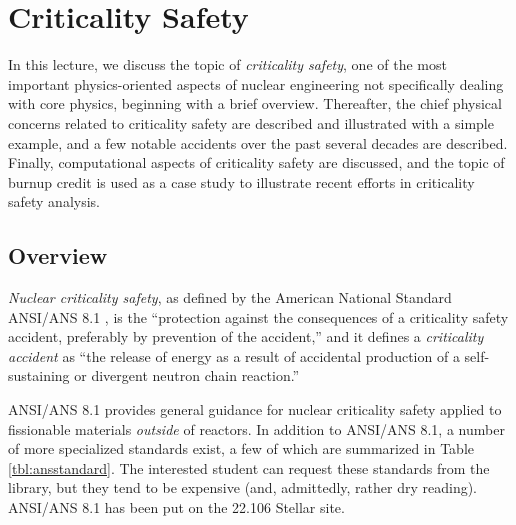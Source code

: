 \chapter{Criticality Safety}
\label{lec:criticalitysafety}

In this lecture, we discuss the topic of \textit{criticality safety}, one 
of the most important physics-oriented aspects of nuclear engineering not 
specifically dealing with core physics, beginning with a brief  
overview.  Thereafter, the chief physical concerns related to criticality 
safety are described and illustrated with a simple example, and a few 
notable 
accidents over the past several decades are described.  Finally, 
computational aspects of criticality safety are discussed, and the topic 
of burnup credit is used as a case study to illustrate recent efforts in 
criticality safety analysis.


\section*{Overview}

\textit{Nuclear criticality safety}, 
as defined by the American National Standard ANSI/ANS 8.1 \cite{ans8_1}, is
the ``protection against the consequences of a criticality safety
accident, preferably by prevention of the accident,'' and it defines
a \textit{criticality accident} as ``the release of energy as a 
result of accidental production of a self-sustaining or
divergent neutron chain reaction.''

ANSI/ANS 8.1 provides general guidance for 
nuclear criticality safety applied to fissionable materials \textit{outside} 
of reactors.  In addition to ANSI/ANS 8.1, a number of more specialized 
standards exist, a few of which are 
summarized in Table \ref{tbl:ansstandard}. The interested 
student can request these standards from the library, but they tend to be 
expensive (and, admittedly, rather dry reading).  ANSI/ANS 8.1 has been
put on the 22.106 Stellar site.

